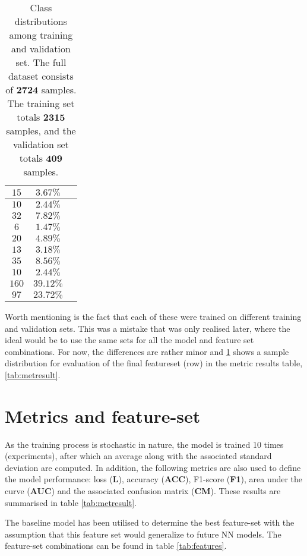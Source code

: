 \begin{table}[H]
\begin{tabular}{|c|c|c|}
		$15$  & $3.67\%$ \\ \hline 
		$10$  & $2.44\%$ \\ \hline 
		$32$  & $7.82\%$ \\ \hline 
		$6$   & $1.47\%$ \\ \hline 
		$20$  & $4.89\%$ \\ \hline 
		$13$  & $3.18\%$ \\ \hline
		$35$  & $8.56\%$ \\ \hline
		$10$  & $2.44\%$ \\ \hline
		$160$ & $39.12\%$ \\ \hline
		$97$  & $23.72\%$ \\ \hline
	\end{tabular}
	\caption{Class distributions among training and validation set. The full dataset consists of $\bm{2724}$ samples. The training set totals $\bm{2315}$ samples, and the validation set totals $\bm{409}$ samples.}
	\label{tab:classdist}
\end{table}

Worth mentioning is the fact that each of these were trained on different training and validation sets. This was a mistake that was only realised later, where the ideal would be to use the same sets for all the model and feature set combinations. For now, the differences are rather minor and \ref{tab:classdist} shows a sample distribution for evaluation of the final  featureset (row) in the metric results table, \ref{tab:metresult}. 

\section{Metrics and feature-set}
As the training process is stochastic in nature, the model is trained 10 times (experiments), after which an average along with the associated standard deviation are computed. In addition, the following metrics are also used to define the model performance: loss (\textbf{L}), accuracy (\textbf{ACC}), F1-score (\textbf{F1}), area under the curve (\textbf{AUC}) and the associated confusion matrix (\textbf{CM}).  These results are summarised in table \ref{tab:metresult}.

The baseline model has been utilised to determine the best feature-set with the assumption that this feature set would generalize to future NN models. The feature-set combinations can be found in table \ref{tab:features}.

